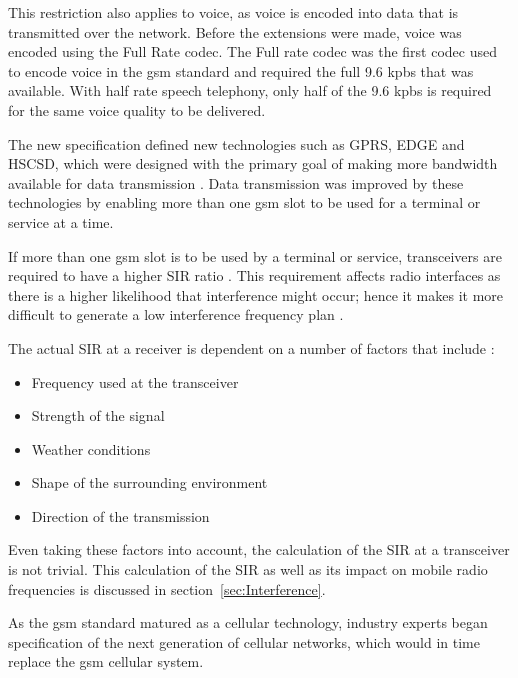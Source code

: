This restriction also applies to voice, as voice is encoded into data that is transmitted over the network\cite{Karen2004, GSM92}. Before the extensions were made, voice was encoded using the Full Rate codec\cite{GSMArchitectureProtocolsServices}. The Full rate codec was the first codec used to encode voice in the \gls{gsm} standard and required the full 9.6 kpbs that was available\cite{GSMArchitectureProtocolsServices}. With half rate speech telephony, only half of the 9.6 kpbs is required for the same voice quality to be delivered\cite{GSMArchitectureProtocolsServices}.  

The new specification defined new technologies such as GPRS, EDGE and HSCSD, which were designed with the primary goal of making more bandwidth available for data transmission \cite{GSMArchitectureProtocolsServices,Karen2004}. Data transmission was improved by these technologies by enabling more than one \gls{gsm} slot to be used for a terminal or service at a time\cite{GSMArchitectureProtocolsServices,Karen2004}.

If more than one \gls{gsm} slot is to be used by a terminal or service, transceivers are required to have a higher \gls{SIR} ratio \cite{GSMArchitectureProtocolsServices,GSMSysEngin}. This requirement affects radio interfaces as there is a higher likelihood that interference might occur; hence it makes it more difficult to generate a low interference frequency plan \cite{Eisenblatter,GSMSysEngin}. 

The actual \gls{SIR} at a receiver is dependent on a number of factors that include \cite{GSMArchitectureProtocolsServices,Karen2004}:
\begin{itemize}
\item Frequency used at the transceiver
\item Strength of the signal
\item Weather conditions
\item Shape of the surrounding environment
\item Direction of the transmission
\end{itemize}
Even taking these factors into account, the calculation of the \gls{SIR} at a transceiver is not trivial. This calculation of the \gls{SIR} as well as its impact on mobile radio frequencies is discussed in section~\ref{sec:Interference}.

As the \gls{gsm} standard matured as a cellular technology, industry experts began specification of the next generation of cellular networks, which would in time replace the \gls{gsm} cellular system. 

